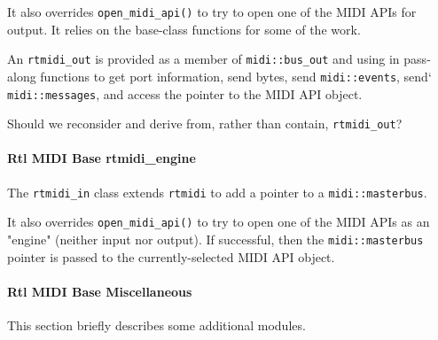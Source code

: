    It also overrides \texttt{open\_midi\_api()} to try to open
   one of the MIDI APIs for output.
   It relies on the base-class functions for some of the work.

   An \texttt{rtmidi\_out} is provided as a member of \texttt{midi::bus\_out}
   and using in pass-along functions to get port information, send bytes,
   send \texttt{midi::events},
   send` \texttt{midi::messages}, and access the pointer to the
   MIDI API object.

   Should we reconsider and derive from, rather than contain,
   \texttt{rtmidi\_out}?

\paragraph{Rtl MIDI Base rtmidi\_engine}
\label{paragraph:rtl_midi_rtmidi_engine}

   The \texttt{rtmidi\_in} class extends \texttt{rtmidi} to
   add a pointer to a \texttt{midi::masterbus}.

   It also overrides \texttt{open\_midi\_api()} to try to open
   one of the MIDI APIs as an "engine" (neither input nor output).
   If successful, then the \texttt{midi::masterbus} pointer is
   passed to the currently-selected MIDI API object.

\paragraph{Rtl MIDI Base Miscellaneous}
\label{paragraph:rtl_midi_miscellaneous}

   This section briefly describes some additional modules.


